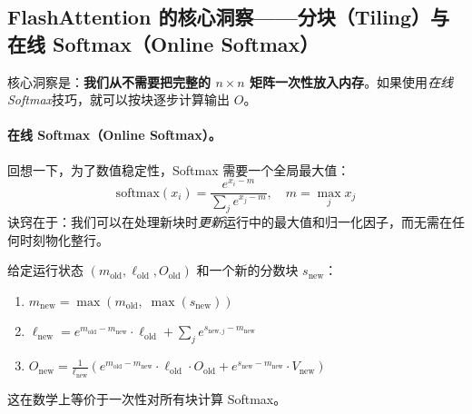\subsection{FlashAttention 的核心洞察——分块（Tiling）与在线 Softmax（Online Softmax）}
\label{the-flash-attention-key-insight-tiling-and-online-softmax}

核心洞察是：\textbf{我们从不需要把完整的 $n \times n$ 矩阵一次性放入内存}。如果使用\emph{在线 Softmax}技巧，就可以按块逐步计算输出 $O$。

\paragraph{在线 Softmax（Online Softmax）。}
\label{online-softmax.}

回想一下，为了数值稳定性，Softmax 需要一个全局最大值：
\[
\text{softmax}(x_i) = \frac{e^{x_i - m}}{\sum_j e^{x_j - m}}, \quad m = \max_j x_j
\]
诀窍在于：我们可以在处理新块时\emph{更新}运行中的最大值和归一化因子，而无需在任何时刻物化整行。

\begin{keybox}
给定运行状态 $(m_{\text{old}}, \ell_{\text{old}}, O_{\text{old}})$ 和一个新的分数块 $s_{\text{new}}$：

\begin{enumerate}
  \item $m_{\text{new}} = \max(m_{\text{old}},\; \max(s_{\text{new}}))$
  \item $\ell_{\text{new}} = e^{m_{\text{old}} - m_{\text{new}}} \cdot \ell_{\text{old}}
        + \sum_j e^{s_{\text{new},j} - m_{\text{new}}}$
  \item $O_{\text{new}} = \frac{1}{\ell_{\text{new}}} \left(
        e^{m_{\text{old}} - m_{\text{new}}} \cdot \ell_{\text{old}} \cdot O_{\text{old}}
        + e^{s_{\text{new}} - m_{\text{new}}} \cdot V_{\text{new}} \right)$
\end{enumerate}

这在数学上等价于一次性对所有块计算 Softmax。
\end{keybox}

